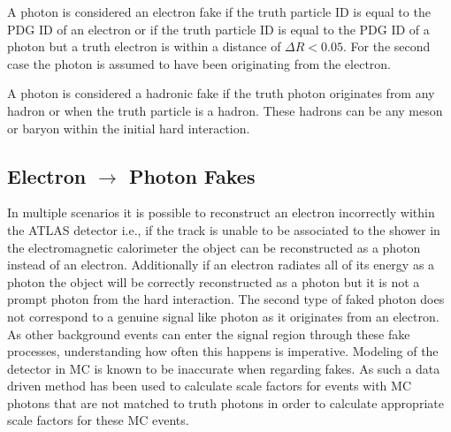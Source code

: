 A photon is considered an electron fake if the truth particle ID is equal to the PDG ID of an electron or if the truth particle ID is equal to the PDG ID of a photon but a truth electron is within a distance of $\Delta R < 0.05$.  For the second case the photon is assumed to have been originating from the electron.  

A photon is considered a hadronic fake if the truth photon originates from any hadron or when the truth particle is a hadron.  These hadrons can be any meson or baryon within the initial hard interaction.

\subsection{Electron $\rightarrow$ Photon Fakes}
\label{sec:FakePho}

In multiple scenarios it is possible to reconstruct an electron incorrectly within the ATLAS detector i.e., if the track is unable to be associated to the shower in the electromagnetic calorimeter the object can be reconstructed as a photon instead of an electron.  Additionally if an electron radiates all of its energy as a photon the object will be correctly reconstructed as a photon but it is not a prompt photon from the hard interaction.  The second type of faked photon does not correspond to a genuine signal like photon as it originates from an electron.  As other background events can enter the signal region through these fake processes, understanding how often this happens is imperative.  Modeling of the detector in MC is known to be inaccurate when regarding fakes.  As such a data driven method has been used to calculate scale factors for events with MC photons that are not matched to truth photons in order to calculate appropriate scale factors for these MC events.

